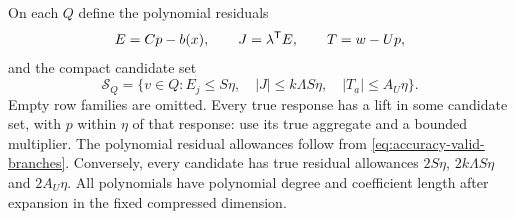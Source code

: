 On each $Q$ define the polynomial residuals
\[
 E=Cp-b(x),\qquad J=\lambda^{\mathsf T} E,\qquad T=w-Up,
\]
and the compact candidate set
\begin{equation}\label{eq:accuracy-candidate}
 \mathcal S_Q=\{v\in Q:E_j\le S\eta,\quad
        |J|\le k\Lambda S\eta,\quad |T_a|\le A_U\eta\}.
\end{equation}
Empty row families are omitted. Every true response has a lift in some
candidate set, with $p$ within $\eta$ of that response: use its true
aggregate and a bounded multiplier. The polynomial residual allowances
follow from \eqref{eq:accuracy-valid-branches}. Conversely, every
candidate has true residual allowances $2S\eta$, $2k\Lambda S\eta$ and
$2A_U\eta$. All polynomials have polynomial degree and coefficient
length after expansion in the fixed compressed dimension.

